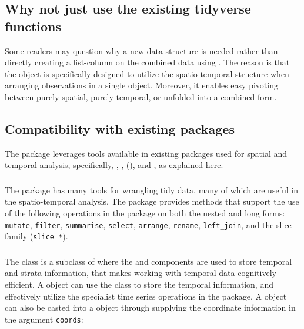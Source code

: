 \documentclass[
  shortnames]{jss}
\begin{document}
\hypertarget{tidyverse}{%
\subsection{Why not just use the existing tidyverse functions}\label{tidyverse}}

Some readers may question why a new data structure is needed rather than directly creating a list-column on the combined data using . The reason is that the  object is specifically designed to utilize the spatio-temporal structure when arranging observations in a single object. Moreover, it enables easy pivoting between purely spatial, purely temporal, or unfolded into a combined form.

\hypertarget{compact}{%
\subsection{Compatibility with existing packages}\label{compact}}

The  package leverages tools available in existing packages used for spatial and temporal analysis, specifically, , ,  (), and , as explained here.

\subsubsection[]{}

The  package has many tools for wrangling tidy data, many of which are useful in the spatio-temporal analysis. The  package provides methods that support the use of the following operations in the  package on both the nested and long forms: \texttt{mutate}, \texttt{filter}, \texttt{summarise}, \texttt{select}, \texttt{arrange}, \texttt{rename}, \texttt{left\_join}, and the slice family (\texttt{slice\_*}).

\subsubsection[]{}

The  class is a subclass of  where the  and  components are used to store temporal and strata information, that makes working with temporal data cognitively efficient. A  object can use the  class to store the temporal information, and effectively utilize the specialist time series operations in the  package. A  object can also be casted into a  object through supplying the coordinate information in the argument \texttt{coords}:
\end{document}
